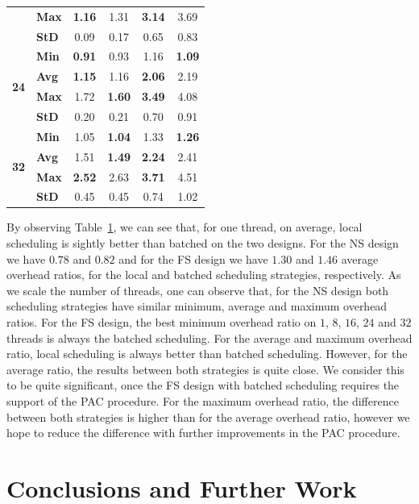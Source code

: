 \documentclass{llncs}
\begin{document}
\begin{table}[!ht]
\begin{tabular}{ll|cc|cc}
& {\bf Max }& {\bf 1.16}& 1.31& {\bf 3.14}& 3.69\\
& {\bf StD }& 0.09& 0.17& 0.65& 0.83\\
\hline
\multirow{4}{*}{\bf 24}
& {\bf Min }& {\bf 0.91}& 0.93& 1.16& {\bf 1.09}\\
& {\bf Avg }& {\bf 1.15}& 1.16& {\bf 2.06}& 2.19\\
& {\bf Max }& 1.72& {\bf 1.60}& {\bf 3.49}& 4.08\\
& {\bf StD }& 0.20& 0.21& 0.70& 0.91\\
\hline
\multirow{4}{*}{\bf 32}
& {\bf Min }& 1.05& {\bf 1.04}& 1.33& {\bf 1.26}\\
& {\bf Avg }& 1.51& {\bf 1.49}& {\bf 2.24}& 2.41\\
& {\bf Max }& {\bf 2.52}& 2.63& {\bf 3.71}& 4.51\\
& {\bf StD }& 0.45& 0.45& 0.74& 1.02\\
\hline\hline
\end{tabular}%
\label{tab_batched_overhead}
\end{table}

By observing Table~\ref{tab_batched_overhead}, we can see that, for
one thread, on average, local scheduling is sightly better than
batched on the two designs. For the NS design we have $0.78$ and
$0.82$ and for the FS design we have $1.30$ and $1.46$ average
overhead ratios, for the local and batched scheduling strategies,
respectively. As we scale the number of threads, one can observe that,
for the NS design both scheduling strategies have similar minimum,
average and maximum overhead ratios. For the FS design, the best
minimum overhead ratio on $1$, $8$, $16$, $24$ and $32$ threads is
always the batched scheduling. For the average and maximum overhead
ratio, local scheduling is always better than batched
scheduling. However, for the average ratio, the results between both
strategies is quite close. We consider this to be quite significant,
once the FS design with batched scheduling requires the support of the
PAC procedure. For the maximum overhead ratio, the difference between
both strategies is higher than for the average overhead ratio, however
we hope to reduce the difference with further improvements in the PAC
procedure.

\section{Conclusions and Further Work}







\end{document}
